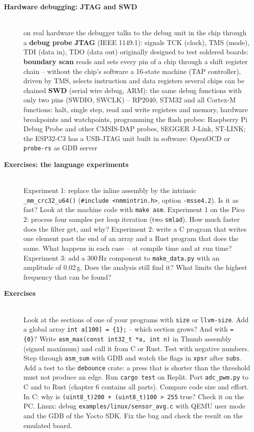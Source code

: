 \begin{description}
\item[{\rot\bf Hardware debugging: JTAG and SWD}]~\\[-\lblskip]
\bi
	\ite on real hardware the debugger talks to the debug unit in the chip through a \textbf{debug probe}
	\ite \textbf{JTAG} (IEEE 1149.1): signals TCK (clock), TMS (mode), TDI (data in), TDO (data out)
	\bi
		\ite originally designed to test soldered boards: \textbf{boundary scan} reads and sets every pin of a chip through a shift register chain -- without the chip's software
		\ite a 16-state machine (TAP controller), driven by TMS, selects instruction and data registers
		\ite several chips can be chained
	\ei
	\ite \textbf{SWD} (serial wire debug, ARM): the same debug functions with only two pins (SWDIO, SWCLK) -- RP2040, STM32 and all Cortex-M
	\ite functions: halt, single step, read and write registers and memory, hardware breakpoints and watchpoints, programming the flash
	\ite probes: Raspberry Pi Debug Probe and other CMSIS-DAP probes, SEGGER J-Link, ST-LINK; the ESP32-C3 has a USB-JTAG unit built in
	\ite software: OpenOCD or \texttt{probe-rs} as GDB server
\ei
\os{\newpage}

\item[{\rot\bf Exercises: the language experiments}]~\\[-\lblskip]
\bi
	\ite Experiment 1: replace the inline assembly by the intrinsic \texttt{\_mm\_crc32\_u64()} (\texttt{\#include <nmmintrin.h>}, option \texttt{-msse4.2}). Is it as fast? Look at the machine code with \texttt{make asm}.
	\ite Experiment 1 on the Pico 2: process four samples per loop iteration (two \texttt{smlad}). How much faster does the filter get, and why?
	\ite Experiment 2: write a C program that writes one element past the end of an array and a Rust program that does the same. What happens in each case -- at compile time and at run time?
	\ite Experiment 3: add a 300\,Hz component to \texttt{make\_data.py} with an amplitude of 0.02\,g. Does the analysis still find it? What limits the highest frequency that can be found?
\ei
\os{\newpage}

\item[{\rot\bf Exercises}]~\\[-\lblskip]
\bi
	\ite Look at the sections of one of your programs with \texttt{size} or \texttt{llvm-size}. Add a global array \texttt{int a[100] = \{1\};} -- which section grows? And with \texttt{= \{0\}}?
	\ite Write \texttt{asm\_max(const int32\_t *a, int n)} in Thumb assembly (signed maximum) and call it from C or Rust. Test with negative numbers.
	\ite Step through \texttt{asm\_sum} with GDB and watch the flags in \texttt{xpsr} after \texttt{subs}.
	\ite Add a test to the \texttt{debounce} crate: a press that is shorter than the threshold must not produce an edge. Run \texttt{cargo test} on Replit.
	\ite Port \texttt{adc\_pwm.py} to C and to Rust (chapter 6 contains all parts). Compare code size and effort.
	\ite In C: why is \texttt{(uint8\_t)200 + (uint8\_t)100 > 255} true? Check it on the PC.
	\ite Linux: debug \texttt{examples/linux/sensor\_avg.c} with QEMU user mode and the GDB of the Yocto SDK. Fix the bug and check the result on the emulated board.
\ei
\end{description}
